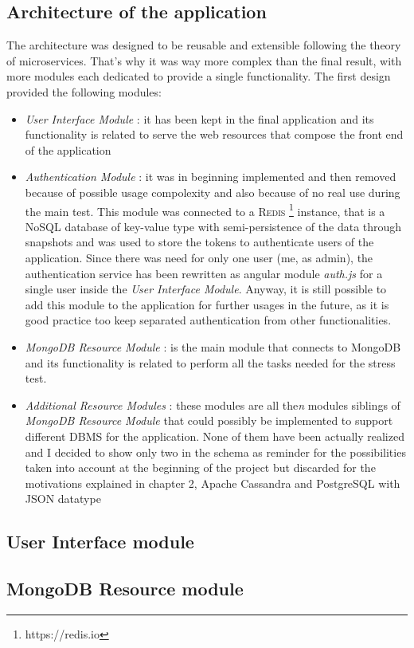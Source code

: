 \subsection{Architecture of the application}
The architecture was designed to be reusable and extensible following the theory of microservices. That’s why it was way more complex than the final result, with more modules each dedicated to provide a single functionality. The first design provided the following modules:
\begin{itemize}
	\item \textit{User Interface Module} : it has been kept in the final application and its functionality is related to serve the web resources that compose the front end of the application
	\item \textit{Authentication Module} : it was in beginning implemented and then removed because of possible usage compolexity and also because of no real use during the main test. This module was connected to a \textsc{Redis} \footnote{https://redis.io} instance, that is a NoSQL database of key-value type with semi-persistence of the data through snapshots and was used to store the tokens to authenticate users of the application. Since there was need for only one user (me, as admin), the authentication service has been rewritten as angular module \textit{auth.js} for a single user inside the \textit{User Interface Module}. Anyway, it is still possible to add this module to the application for further usages in the future, as it is good practice too keep separated authentication from other functionalities.
	\item \textit{MongoDB Resource Module} : is the main module that connects to MongoDB and its functionality is related to perform all the tasks needed for the stress test.
	\item \textit{Additional Resource Modules} : these modules are all the\textit{n} modules siblings of \textit{MongoDB Resource Module} that could possibly be implemented to support different DBMS for the application. None of them have been actually realized and I decided to show only two in the schema as reminder for the possibilities taken into account at the beginning of the project but discarded for the motivations explained in chapter 2, Apache Cassandra and PostgreSQL with JSON datatype
\end{itemize}

\subsection{User Interface module}

\subsection{MongoDB Resource module}